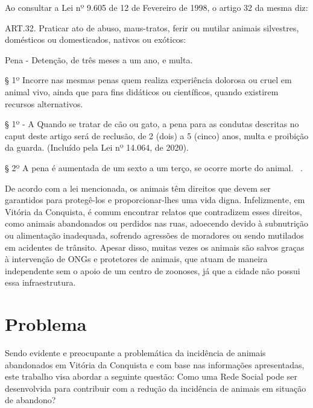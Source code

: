 Ao consultar a Lei nº 9.605 de 12 de Fevereiro de 1998, o artigo 32 da mesma diz:
\begin{citacao}
ART.32. Praticar ato de abuso, maus-tratos, ferir ou mutilar animais silvestres, domésticos ou domesticados, nativos ou exóticos:

Pena - Detenção, de três meses a um ano, e multa.

§ 1º Incorre nas mesmas penas quem realiza experiência dolorosa ou cruel em animal vivo, ainda que para fins didáticos ou científicos, quando existirem recursos alternativos.

§ 1º - A Quando se tratar de cão ou gato, a pena para as condutas descritas no caput deste artigo será de reclusão, de 2 (dois) a 5 (cinco) anos, multa e proibição da guarda. (Incluído pela Lei nº 14.064, de 2020).

§ 2º A pena é aumentada de um sexto a um terço, se ocorre morte do animal. ~\cite{lei}. 
\end{citacao}

De acordo com a lei mencionada, os animais têm direitos que devem ser garantidos para protegê-los e proporcionar-lhes uma vida digna. Infelizmente, em Vitória da Conquista, é comum encontrar relatos que contradizem esses direitos, como animais abandonados ou perdidos nas ruas, adoecendo devido à subnutrição ou alimentação inadequada, sofrendo agressões de moradores ou sendo mutilados em acidentes de trânsito. Apesar disso, muitas vezes os animais são salvos graças à intervenção de ONGs e protetores de animais, que atuam de maneira independente sem o apoio de um centro de zoonoses, já que a cidade não possui essa infraestrutura.

\section{Problema}
\label{sec:Problema}
Sendo evidente e preocupante a problemática da incidência de animais abandonados em Vitória da Conquista e com base nas informações apresentadas, este trabalho visa abordar a seguinte questão: Como uma Rede Social pode ser desenvolvida para contribuir com a redução da incidência de animais em situação de abandono?

